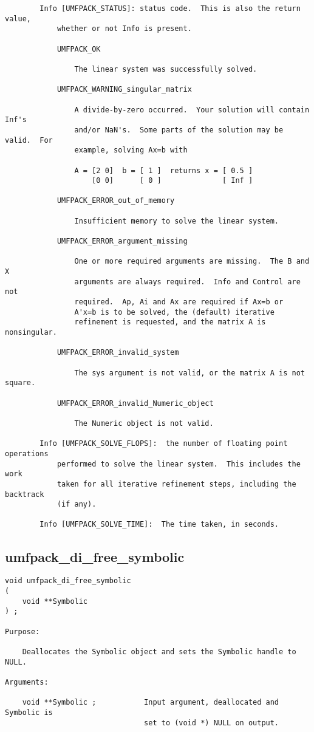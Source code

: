 \documentclass[11pt]{article}
\begin{document}
{\begin{verbatim}
        Info [UMFPACK_STATUS]: status code.  This is also the return value,
            whether or not Info is present.

            UMFPACK_OK

                The linear system was successfully solved.

            UMFPACK_WARNING_singular_matrix

                A divide-by-zero occurred.  Your solution will contain Inf's
                and/or NaN's.  Some parts of the solution may be valid.  For
                example, solving Ax=b with

                A = [2 0]  b = [ 1 ]  returns x = [ 0.5 ]
                    [0 0]      [ 0 ]              [ Inf ]

            UMFPACK_ERROR_out_of_memory

                Insufficient memory to solve the linear system.

            UMFPACK_ERROR_argument_missing

                One or more required arguments are missing.  The B and X
                arguments are always required.  Info and Control are not
                required.  Ap, Ai and Ax are required if Ax=b or
                A'x=b is to be solved, the (default) iterative
                refinement is requested, and the matrix A is nonsingular.

            UMFPACK_ERROR_invalid_system

                The sys argument is not valid, or the matrix A is not square.

            UMFPACK_ERROR_invalid_Numeric_object

                The Numeric object is not valid.

        Info [UMFPACK_SOLVE_FLOPS]:  the number of floating point operations
            performed to solve the linear system.  This includes the work
            taken for all iterative refinement steps, including the backtrack
            (if any).

        Info [UMFPACK_SOLVE_TIME]:  The time taken, in seconds.
\end{verbatim}
}


\newpage

\subsection{umfpack\_di\_free\_symbolic}
{\footnotesize
\begin{verbatim}
void umfpack_di_free_symbolic
(
    void **Symbolic
) ;

Purpose:

    Deallocates the Symbolic object and sets the Symbolic handle to NULL.

Arguments:

    void **Symbolic ;           Input argument, deallocated and Symbolic is
                                set to (void *) NULL on output.
\end{verbatim}
}
\end{document}
